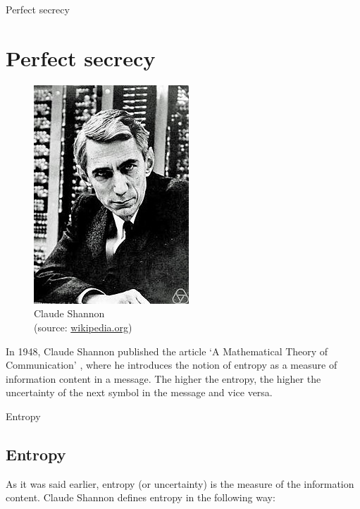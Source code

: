 \documentclass{beamer}
\begin{document}
\begin{frame}{Perfect secrecy}
	\section{Perfect secrecy}
    \begin{figure}
        \begin{center}
        \includegraphics[height=0.35\textheight]{shannon.jpg}
        \end{center}
    \caption{Claude Shannon \\ (source: \href{https://wikipedia.org}{wikipedia.org})}
    \end{figure}
    In 1948, Claude Shannon published the article `A Mathematical Theory of Communication' \cite{shannon-1948}, where he introduces the notion of entropy as a measure
    of information content in a message. The higher the entropy, the higher the uncertainty of the next symbol in the message and vice
    versa.
\end{frame}

\begin{frame}{Entropy}
    \subsection{Entropy}
    As it was said earlier, entropy (or uncertainty) is the measure of the information content. 
    Claude Shannon defines entropy in the following way:
\end{frame}
\end{document}
